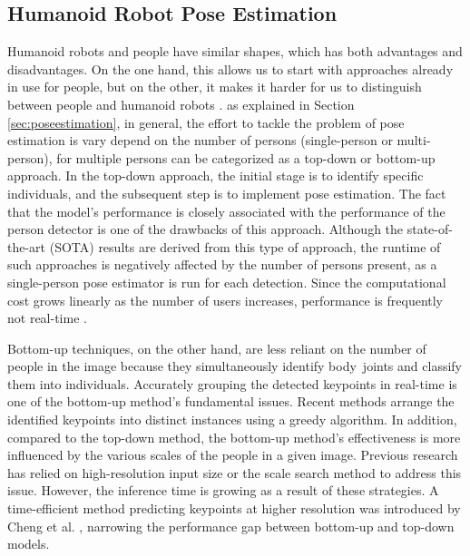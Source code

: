 \subsection{Humanoid Robot Pose Estimation}
\label{subsec:humanoidrobotposeestimation}

Humanoid robots and people have similar shapes, which has both advantages and disadvantages. On the one hand, this allows us to start with approaches already in use for people, but on the other, it makes it harder for us to distinguish between people and humanoid robots \parencite{amini2021}.
as explained in Section \ref{sec:poseestimation}, in general, the effort to tackle the problem of pose estimation is vary depend on the number of persons (single-person or multi-person), for multiple persons can be categorized as a top-down or bottom-up approach.
In the top-down approach, the initial stage is to identify specific individuals, and the subsequent step is to implement pose estimation. The fact that the model's performance is closely associated with the performance of the person detector is one of the drawbacks of this approach. Although the state-of-the-art (SOTA) results are derived from this type of approach,  the runtime of such approaches is negatively affected by the number of persons present,
as a single-person pose estimator is run for each detection. Since the computational cost grows linearly as the number of users increases, performance is frequently not real-time \parencite{amini2021}.

Bottom-up techniques, on the other hand, are less reliant on the number of people in the image because they simultaneously identify body joints and classify them into individuals. Accurately grouping the detected keypoints in real-time is one of the bottom-up method's fundamental issues.
Recent methods arrange the identified keypoints into distinct instances using a greedy algorithm. In addition, compared to the top-down method, the bottom-up method's effectiveness is more influenced by the various scales of the people in a given image. Previous research has relied on high-resolution input size \parencite{papandreou2018} or the scale search method \parencite{cao2019} to address this issue. However, the inference time is growing as a result of these strategies.
A time-efficient method predicting keypoints at higher resolution was introduced by Cheng et al. \parencite{cheng2020}, narrowing the performance gap between bottom-up and top-down models.
